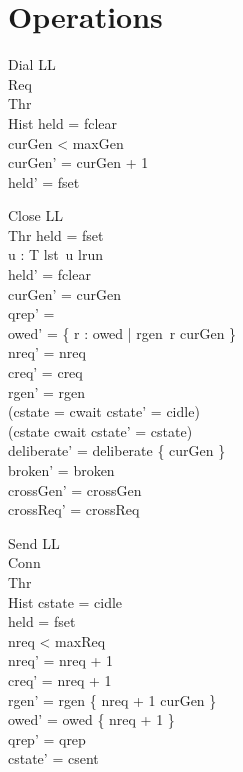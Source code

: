 \documentclass[a4paper,10pt,fleqn]{article}
\begin{document}
\section{Operations}

\begin{schema}{Dial}
  \Delta LL \\
  \Xi Req \\
  \Xi Thr \\
  \Xi Hist
\where
  held = fclear \\
  curGen < maxGen \\
  curGen' = curGen + 1 \\
  held' = fset
\end{schema}

\begin{schema}{Close}
  \Delta LL \\
  \Xi Thr
\where
  held = fset \\
  \forall u : T \spot lst~u \neq lrun \\
  held' = fclear \\
  curGen' = curGen \\
  qrep' = \emptyset \\
  owed' = \{ r : owed | rgen~r \neq curGen \} \\
  nreq' = nreq \\
  creq' = creq \\
  rgen' = rgen \\
  (cstate = cwait \implies cstate' = cidle) \\
  (cstate \neq cwait \implies cstate' = cstate) \\
  deliberate' = deliberate \cup \{ curGen \} \\
  broken' = broken \\
  crossGen' = crossGen \\
  crossReq' = crossReq
\end{schema}

\begin{schema}{Send}
  \Delta LL \\
  \Xi Conn \\
  \Xi Thr \\
  \Xi Hist
\where
  cstate = cidle \\
  held = fset \\
  nreq < maxReq \\
  nreq' = nreq + 1 \\
  creq' = nreq + 1 \\
  rgen' = rgen \oplus \{ nreq + 1 \mapsto curGen \} \\
  owed' = owed \cup \{ nreq + 1 \} \\
  qrep' = qrep \\
  cstate' = csent
\end{schema}
\end{document}
